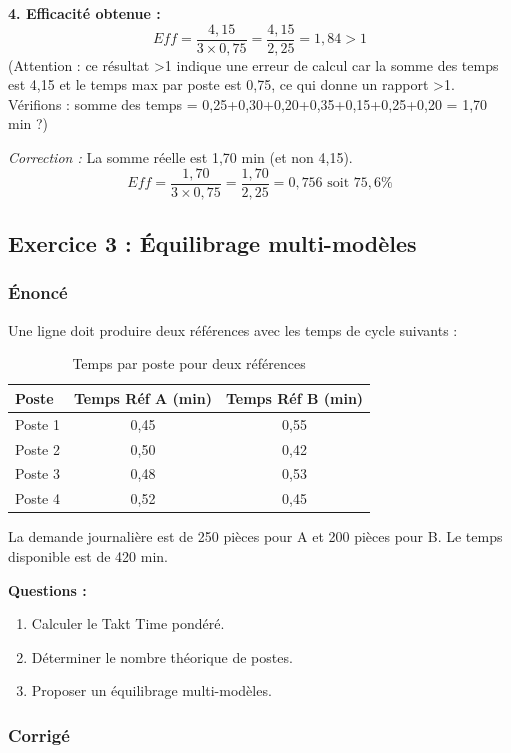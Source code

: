 \documentclass[12pt,a4paper]{article}
\begin{document}
\begin{center}
\textbf{4. Efficacité obtenue :}
\[
Eff = \frac{4,15}{3 \times 0,75} = \frac{4,15}{2,25} = 1,84 > 1
\]
(Attention : ce résultat >1 indique une erreur de calcul car la somme des temps est 4,15 et le temps max par poste est 0,75, ce qui donne un rapport >1. Vérifions : somme des temps = 0,25+0,30+0,20+0,35+0,15+0,25+0,20 = 1,70 min ?)

\textit{Correction :} La somme réelle est 1,70 min (et non 4,15). \\
\[
Eff = \frac{1,70}{3 \times 0,75} = \frac{1,70}{2,25} = 0,756 \text{ soit } 75,6\%
\]

\subsection{Exercice 3 : Équilibrage multi-modèles}
\subsubsection{Énoncé}
Une ligne doit produire deux références avec les temps de cycle suivants :

\begin{table}[H]
\centering
\begin{tabular}{|l|c|c|}
\hline
\textbf{Poste} & \textbf{Temps Réf A (min)} & \textbf{Temps Réf B (min)} \\ \hline
Poste 1 & 0,45 & 0,55 \\
Poste 2 & 0,50 & 0,42 \\
Poste 3 & 0,48 & 0,53 \\
Poste 4 & 0,52 & 0,45 \\ \hline
\end{tabular}
\caption{Temps par poste pour deux références}
\label{tab:ex3_multi}
\end{table}

La demande journalière est de 250 pièces pour A et 200 pièces pour B. Le temps disponible est de 420 min.

\textbf{Questions :}
\begin{enumerate}
    \item Calculer le Takt Time pondéré.
    \item Déterminer le nombre théorique de postes.
    \item Proposer un équilibrage multi-modèles.
\end{enumerate}

\subsubsection{Corrigé}


\end{center}
\end{document}

